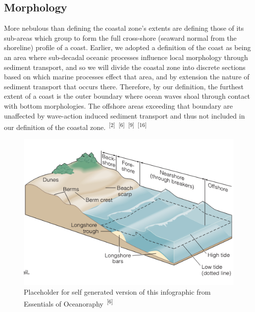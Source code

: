 \documentclass{article}
\begin{document}

\subsection{Morphology}


\par{\hspace{.5cm}More nebulous than defining the coastal zone's extents are defining those of its sub-areas which group to form the full cross-shore (seaward normal from the shoreline) profile of a coast. Earlier, we adopted a definition of the coast as being an area where sub-decadal oceanic processes influence local morphology through sediment transport, and so we will divide the coastal zone into discrete sections based on which marine processes effect that area, and by extension the nature of sediment transport that occurs there. Therefore, by our definition, the furthest extent of a coast is the outer boundary where ocean waves shoal through contact with bottom morphologies. The offshore areas exceeding that boundary are unaffected by wave-action induced sediment transport and thus not included in our definition of the coastal zone.~\textsuperscript{[2]}~\textsuperscript{[6]}~\textsuperscript{[9]}~\textsuperscript{[16]}}


\begin{figure}
    \centering
    \includegraphics[width=1.0\linewidth]{images/coastal-sub-zones.png}
    \caption{Placeholder for self generated version of this infographic from Essentials of Oceanoraphy~\textsuperscript{[6]}}
    \label{figure5}
\end{figure}
\end{document}
